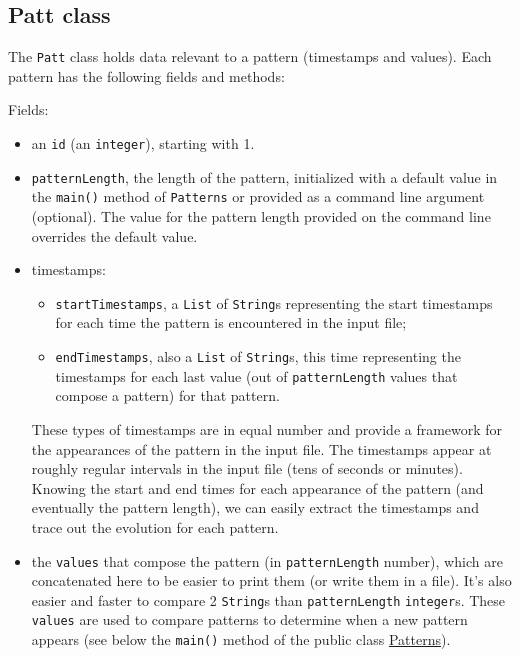 \documentclass[a4paper,12pt]{article}
\begin{document}
  \subsection{Patt class}
  
  The \verb/Patt/ class holds data relevant to a pattern (timestamps and values).
  Each pattern has the following fields and methods:
  
  \noindent
  Fields:
  \begin{itemize}
   \item an \verb/id/ (an \verb/integer/), starting with 1.
   \item \verb/patternLength/, the length of the pattern, initialized with a default
    value in the \verb/main()/ method of \verb/Patterns/ or provided as a command line argument
    (optional). The value for the pattern length provided on the command line overrides
    the default value.
   \item timestamps:
    \begin{itemize}
     \item \verb/startTimestamps/, a \verb/List/ of \verb/String/s representing the start
      timestamps for each time the pattern is encountered in the input file;
     \item \verb/endTimestamps/, also a \verb/List/ of \verb/String/s, this time representing
      the timestamps for each last value (out of \verb/patternLength/ values that compose a pattern)
      for that pattern.
    \end{itemize}
    These types of timestamps are in equal number and provide a framework for the appearances of
    the pattern in the input file. The timestamps appear at roughly regular intervals in the input
    file (tens of seconds or minutes). Knowing the start and end times for each appearance of the
    pattern (and eventually the pattern length), we can easily extract the timestamps and trace out
    the evolution for each pattern.
   \item the \verb/values/ that compose the pattern (in \verb/patternLength/ number), which are
    concatenated here to be easier to print them (or write them in a file). It's also easier and
    faster to compare 2 \verb/String/s than \verb/patternLength/ \verb/integer/s. These \verb/values/
    are used to compare patterns to determine when a new pattern appears (see below the \verb/main()/
    method of the public class \hyperlink{patt}{Patterns}).
  \end{itemize}
  
\end{document}
